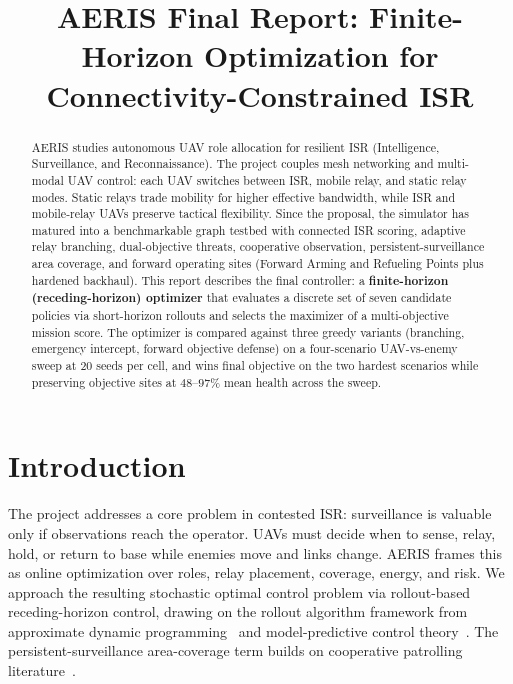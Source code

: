 \documentclass[conference]{IEEEtran}
\title{AERIS Final Report: Finite-Horizon Optimization for Connectivity-Constrained ISR}
\author{
\IEEEauthorblockN{Jeewoo Choi}
\IEEEauthorblockA{Stanford University\\jchoi23@stanford.edu}
}
\begin{document}
\maketitle

\begin{abstract}
AERIS studies autonomous UAV role allocation for resilient ISR (Intelligence,
Surveillance, and Reconnaissance). The project couples mesh networking and
multi-modal UAV control: each UAV switches between ISR, mobile relay, and
static relay modes. Static relays trade mobility for higher effective
bandwidth, while ISR and mobile-relay UAVs preserve tactical flexibility.
Since the proposal, the simulator has matured into a benchmarkable graph
testbed with connected ISR scoring, adaptive relay branching, dual-objective
threats, cooperative observation, persistent-surveillance area coverage,
and forward operating sites (Forward Arming and Refueling Points plus
hardened backhaul). This report describes the final controller: a
\textbf{finite-horizon (receding-horizon) optimizer} that evaluates a
discrete set of seven candidate policies via short-horizon rollouts and
selects the maximizer of a multi-objective mission score. The optimizer is
compared against three greedy variants (branching, emergency intercept,
forward objective defense) on a four-scenario UAV-vs-enemy sweep at 20
seeds per cell, and wins final objective on the two hardest scenarios while
preserving objective sites at $48$--$97\%$ mean health across the sweep.
\end{abstract}

\section{Introduction}
The project addresses a core problem in contested ISR: surveillance is valuable
only if observations reach the operator. UAVs must decide when to sense, relay,
hold, or return to base while enemies move and links change. AERIS frames this
as online optimization over roles, relay placement, coverage, energy, and risk.
We approach the resulting stochastic optimal control problem via rollout-based
receding-horizon control, drawing on the rollout algorithm framework from
approximate dynamic programming~\cite{bertsekas_rl_2019} and model-predictive
control theory~\cite{mayne_mpc_2000}. The persistent-surveillance
area-coverage term builds on cooperative patrolling literature~\cite{pasqualetti_patrolling_2012}.
\end{document}
